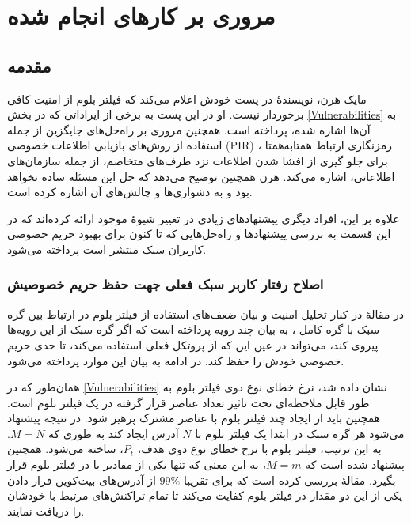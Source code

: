 \chapter{مروری بر کار‌های انجام شده}
\label{LitReview}
\section{مقدمه}

مایک هرن، نویسندهٔ  \cite{Hearn2013}
در پست \cite{Hearn2015} خودش اعلام می‌کند که فیلتر بلوم از امنیت کافی برخوردار نیست. او در این پست به برخی از ایراداتی که در بخش \ref{Vulnerabilities} به آن‌ها اشاره شده، پرداخته است. همچنین مروری بر راه‌حل‌های جایگزین از جمله استفاده از روش‌های بازیابی اطلاعات خصوصی
(PIR)
، رمزنگاری ارتباط همتا‌به‌همتا برای جلو گیری از افشا شدن اطلاعات نزد طرف‌های متخاصم، از جمله سازمان‌های اطلاعاتی، اشاره می‌کند. هرن همچنین توضیح می‌دهد که حل این مسئله ساده نخواهد بود و به دشواری‌ها و چالش‌های آن اشاره کرده است\cite{Hearn2015}.

علاوه بر این، افراد دیگری پیشنهاد‌های زیادی در تغییر شیوهٔ موجود ارائه کرده‌اند که در این قسمت به بررسی پیشنهاد‌ها و راه‌حل‌هایی که تا کنون برای بهبود حریم خصوصی کاربران سبک منتشر است پرداخته می‌شود. 


\subsection{
اصلاح رفتار کاربر سبک فعلی جهت حفظ حریم خصوصیش
}
\label{change_behaviour}
در مقالهٔ \cite{Gervais2014} در کنار تحلیل امنیت و بیان ضعف‌های استفاده از فیلتر بلوم در ارتباط بین گره سبک با گره کامل \cite{Hearn2013}، به بیان چند رویه پرداخته است که اگر گره سبک از این رویه‌ها پیروی کند، می‌تواند در عین این که از پروتکل فعلی استفاده می‌کند، تا حدی حریم خصوصی خودش را حفظ کند. در ادامه به بیان این موارد پرداخته می‌شود.

	همان‌طور که در \ref{Vulnerabilities} نشان داده شد، نرخ خطای نوع دوی فیلتر بلوم به طور قابل ملاحظه‌ای تحت تاثیر تعداد عناصر قرار گرفته در یک فیلتر بلوم است. همچنین باید از ایجاد چند فیلتر بلوم با عناصر مشترک پرهیز شود. در نتیجه پیشنهاد می‌شود هر گره سبک در ابتدا یک فیلتر بلوم با $N$ آدرس ایجاد کند به طوری که $M=N$. به این ترتیب، فیلتر بلوم با نرخ خطای نوع دوی هدف، $P_t$، ساخته می‌شود. همچنین پیشنهاد شده است که $M=m$، به این معنی که تنها یکی از مقادیر  یا  در فیلتر بلوم قرار بگیرد. مقالهٔ \cite{Gervais2014} بررسی کرده است که برای تقریبا $99\%$ از آدرس‌های بیت‌کوین قرار دادن یکی از این دو مقدار در فیلتر بلوم کفایت می‌کند تا تمام تراکنش‌های مرتبط  با خودشان را دریافت نمایند.
	
